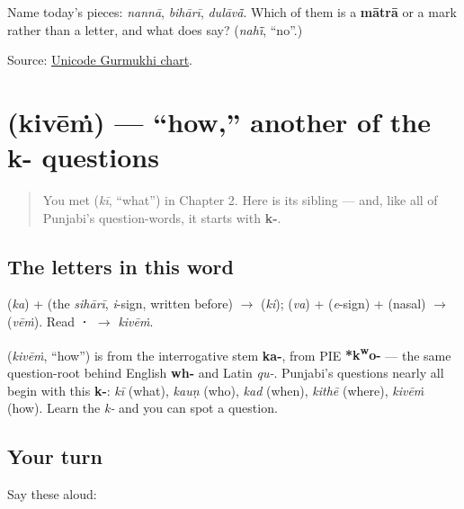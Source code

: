 \begin{tcolorbox}[breakable,colback=teal!4,colframe=teal!35!black,title={Before you move on}]
Name today's pieces: \emph{nannā}, \emph{bihārī}, \emph{dulāvā̃}. Which of them is a \textbf{mātrā} or a mark rather than a letter, and what does \textbf{} say? (\emph{nahī̃}, “no”.)

Source: \href{https://www.unicode.org/charts/PDF/U0A00.pdf}{Unicode Gurmukhi chart}.
\end{tcolorbox}
\section[\texorpdfstring{\pa{ਕਿਵੇਂ} (kivēṁ)}{ਕਿਵੇਂ (kivēṁ)}]{ (kivēṁ) — \textquotedblleft{}how,\textquotedblright{} another of the k- questions}

\label{lesson:PA-C03-kivein}



\begin{quote}
You met \textbf{} (\emph{kī}, \textquotedblleft{}what\textquotedblright{}) in Chapter 2. Here is its sibling — and, like all of Punjabi's question-words, it starts with \textbf{k-}.
\end{quote}

\subsection*{The letters in this word}
\textbf{} (\emph{ka}) + \textbf{} (the \emph{sihārī}, \emph{i}-sign, written before) $\to$ \textbf{} (\emph{ki}); \textbf{} (\emph{va}) + \textbf{} (\emph{e}-sign) + \textbf{} (nasal) $\to$ \textbf{} (\emph{vēṁ}). Read \textbf{·} $\to$ \emph{kivēṁ}.

\begin{cousinweb}
\textbf{} (\emph{kivēṁ}, \textquotedblleft{}how\textquotedblright{}) is from the interrogative stem \textbf{ka-}, from PIE \textbf{*k\textsuperscript{w}o-} — the same question-root behind English \textbf{wh-} and Latin \emph{qu-}. Punjabi's questions nearly all begin with this \textbf{k-}: \emph{kī} (what), \emph{kauṇ} (who), \emph{kad} (when), \emph{kithē} (where), \emph{kivēṁ} (how). Learn the \emph{k-} and you can spot a question.
\end{cousinweb}

\subsection*{Your turn}
Say these aloud:

